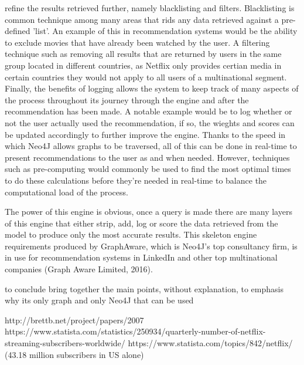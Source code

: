 \documentclass[a4paper]{article}
\begin{document}
refine the results retrieved further, namely blacklisting and filters. Blacklisting is common technique among many areas that rids any data retrieved against a pre-defined 'list'. An example of this in recommendation systems would be the ability to exclude movies that have already been watched by the user. A filtering technique such as removing all results that are returned by users in the same group located in different countries, as Netflix only provides certian media in certain countries they would not apply to all users of a multinational segment. Finally, the benefits of logging allows the system to keep track of many aspects of the process throughout its journey through the engine and after the recommendation has been made. A notable example would be to log whether or not the user actually used the recommendation, if so, the wieghts and scores can be updated accordingly to further improve the engine. Thanks to the speed in which Neo4J allows graphs to be traversed, all of this can be done in real-time to present recommendations to the user as and when needed. However, techniques such as pre-computing would commonly be used to find the most optimal times to do these calculations before they're needed in real-time to balance the computational load of the process.

The power of this engine is obvious, once a query is made there are many layers of this engine that either strip, add, log or score the data retrieved from the model to produce only the most accurate results. This skeleton engine requirements produced by GraphAware, which is Neo4J's top consultancy firm, is in use for recommendation systems in LinkedIn and other top multinational companies (Graph Aware Limited, 2016).


to conclude bring together the main points, without explanation, to emphasis why its only graph and only Neo4J that can be used


http://brettb.net/project/papers/2007%
https://www.statista.com/statistics/250934/quarterly-number-of-netflix-streaming-subscribers-worldwide/
https://www.statista.com/topics/842/netflix/ (43.18 million subscribers in US alone)
\end{document}
